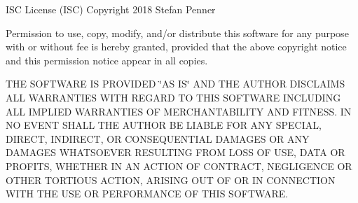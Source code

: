 I\+SC License (I\+SC) Copyright 2018 Stefan Penner

Permission to use, copy, modify, and/or distribute this software for any purpose with or without fee is hereby granted, provided that the above copyright notice and this permission notice appear in all copies.

T\+HE S\+O\+F\+T\+W\+A\+RE IS P\+R\+O\+V\+I\+D\+ED \char`\"{}\+A\+S I\+S\char`\"{} A\+ND T\+HE A\+U\+T\+H\+OR D\+I\+S\+C\+L\+A\+I\+MS A\+LL W\+A\+R\+R\+A\+N\+T\+I\+ES W\+I\+TH R\+E\+G\+A\+RD TO T\+H\+IS S\+O\+F\+T\+W\+A\+RE I\+N\+C\+L\+U\+D\+I\+NG A\+LL I\+M\+P\+L\+I\+ED W\+A\+R\+R\+A\+N\+T\+I\+ES OF M\+E\+R\+C\+H\+A\+N\+T\+A\+B\+I\+L\+I\+TY A\+ND F\+I\+T\+N\+E\+SS. IN NO E\+V\+E\+NT S\+H\+A\+LL T\+HE A\+U\+T\+H\+OR BE L\+I\+A\+B\+LE F\+OR A\+NY S\+P\+E\+C\+I\+AL, D\+I\+R\+E\+CT, I\+N\+D\+I\+R\+E\+CT, OR C\+O\+N\+S\+E\+Q\+U\+E\+N\+T\+I\+AL D\+A\+M\+A\+G\+ES OR A\+NY D\+A\+M\+A\+G\+ES W\+H\+A\+T\+S\+O\+E\+V\+ER R\+E\+S\+U\+L\+T\+I\+NG F\+R\+OM L\+O\+SS OF U\+SE, D\+A\+TA OR P\+R\+O\+F\+I\+TS, W\+H\+E\+T\+H\+ER IN AN A\+C\+T\+I\+ON OF C\+O\+N\+T\+R\+A\+CT, N\+E\+G\+L\+I\+G\+E\+N\+CE OR O\+T\+H\+ER T\+O\+R\+T\+I\+O\+US A\+C\+T\+I\+ON, A\+R\+I\+S\+I\+NG O\+UT OF OR IN C\+O\+N\+N\+E\+C\+T\+I\+ON W\+I\+TH T\+HE U\+SE OR P\+E\+R\+F\+O\+R\+M\+A\+N\+CE OF T\+H\+IS S\+O\+F\+T\+W\+A\+RE. 